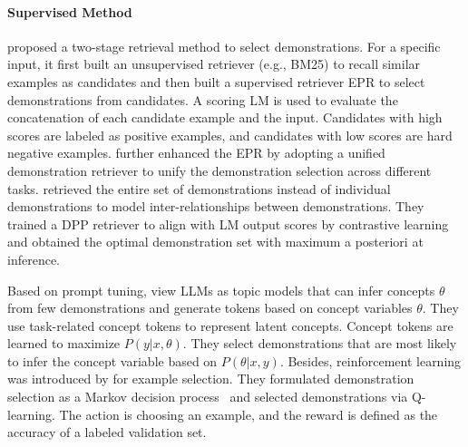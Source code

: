 \paragraph{Supervised Method} \citet{rubin2022learning} proposed a two-stage retrieval method to select demonstrations. For a specific input, it first built an unsupervised retriever (e.g., BM25) to recall similar examples as candidates and then built a supervised retriever EPR to select demonstrations from candidates. A scoring LM is used to evaluate the concatenation of each candidate example and the input. Candidates with high scores are labeled as positive examples, and candidates with low scores are hard negative examples. 
\citet{udr} further enhanced the EPR by adopting a unified demonstration retriever to unify the demonstration selection across different tasks.
\citet{ye2023compositional} retrieved the entire set of demonstrations instead of individual demonstrations to model inter-relationships between demonstrations. They trained a DPP retriever to align with LM output scores by contrastive learning and obtained the optimal demonstration set with maximum a posteriori at inference.

Based on prompt tuning, \citet{topic} view LLMs as topic models that can infer concepts $\theta$ from few demonstrations and generate tokens based on concept variables $\theta$. They use task-related concept tokens to represent latent concepts. Concept tokens are learned to maximize $P(y|x,\theta)$. They select demonstrations that are most likely to infer the concept variable based on $P(\theta|x,y)$. 
Besides, reinforcement learning was introduced by \citet{zhang2022active} for example selection. They formulated demonstration selection as a Markov decision process~\cite{bellman1957markovian} and selected demonstrations via Q-learning. The action is choosing an example, and the reward is defined as the accuracy of a labeled validation set. 




